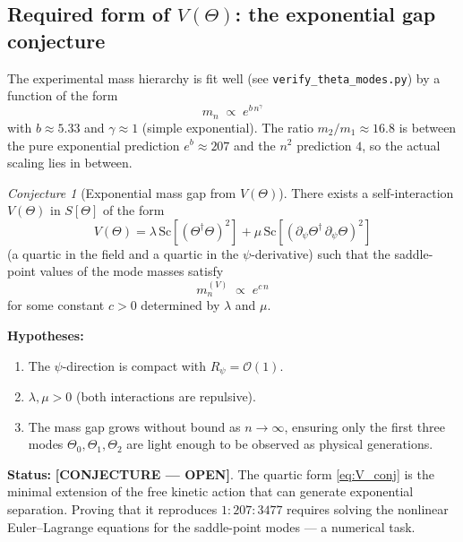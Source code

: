 \documentclass[12pt,a4paper]{article}
\theoremstyle{remark}
\newtheorem{conjecture}[theorem]{Conjecture}
\newcommand{\Sc}{\mathrm{Sc}}
\begin{document}
\subsection{Required form of $V(\Theta)$: the exponential gap conjecture}

The experimental mass hierarchy is fit well (see \texttt{verify\_theta\_modes.py})
by a function of the form
\begin{equation}
  m_n \;\propto\; e^{b\,n^\gamma}
\end{equation}
with $b \approx 5.33$ and $\gamma \approx 1$ (simple exponential).
The ratio $m_2/m_1 \approx 16.8$ is between the pure exponential
prediction $e^b \approx 207$ and the $n^2$ prediction $4$, so the
actual scaling lies in between.

\begin{conjecture}[Exponential mass gap from $V(\Theta)$]
\label{conj:V_theta}
There exists a self-interaction $V(\Theta)$ in $S[\Theta]$ of the form
\begin{equation}
  \label{eq:V_conj}
  V(\Theta)
  = \lambda\,\Sc\!\left[(\Theta^\dagger\Theta)^2\right]
    + \mu\,\Sc\!\left[(\partial_\psi\Theta^\dagger\,\partial_\psi\Theta)^2\right]
\end{equation}
(a quartic in the field and a quartic in the $\psi$-derivative)
such that the saddle-point values of the mode masses satisfy
\begin{equation}
  m_n^{(V)} \;\propto\; e^{c\,n}
\end{equation}
for some constant $c > 0$ determined by $\lambda$ and $\mu$.

\textbf{Hypotheses:}
\begin{enumerate}[label=(\roman*)]
  \item The $\psi$-direction is compact with $R_\psi = \mathcal{O}(1)$.
  \item $\lambda, \mu > 0$ (both interactions are repulsive).
  \item The mass gap grows without bound as $n\to\infty$, ensuring
        only the first three modes $\Theta_0, \Theta_1, \Theta_2$
        are light enough to be observed as physical generations.
\end{enumerate}

\textbf{Status:} \textbf{[CONJECTURE — OPEN]}.  The quartic form
\eqref{eq:V_conj} is the minimal extension of the free kinetic action
that can generate exponential separation.  Proving that it reproduces
$1:207:3477$ requires solving the nonlinear Euler--Lagrange equations
for the saddle-point modes — a numerical task.
\end{conjecture}
\end{document}
